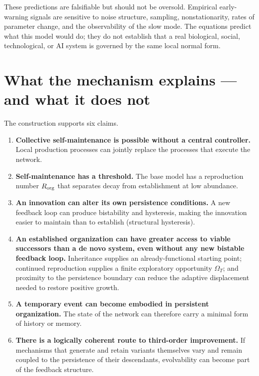 \documentclass[11pt]{article}
\providecommand{\tightlist}{\setlength{\itemsep}{0pt}\setlength{\parskip}{0pt}}
\begin{document}
These predictions are falsifiable but should not be oversold. Empirical
early-warning signals are sensitive to noise structure, sampling,
nonstationarity, rates of parameter change, and the observability of the
slow mode. The equations predict what this model would do; they do not
establish that a real biological, social, technological, or AI system is
governed by the same local normal form.

\section{What the mechanism explains --- and what it does
not}
The construction supports six claims.

\begin{enumerate}
\def\labelenumi{\arabic{enumi}.}
\tightlist
\item
  \textbf{Collective self-maintenance is possible without a central
  controller.} Local production processes can jointly replace the
  processes that execute the network.
\item
  \textbf{Self-maintenance has a threshold.} The base model has a
  reproduction number \(R_{\rm org}\) that separates decay from
  establishment at low abundance.
\item
  \textbf{An innovation can alter its own persistence conditions.} A new
  feedback loop can produce bistability and hysteresis, making the
  innovation easier to maintain than to establish (structural
  hysteresis).
\item
  \textbf{An established organization can have greater access to viable
  successors than a de novo system, even without any new bistable
  feedback loop.} Inheritance supplies an already-functional starting
  point; continued reproduction supplies a finite exploratory
  opportunity \(\Omega_T\); and proximity to the persistence boundary
  can reduce the adaptive displacement needed to restore positive
  growth.
\item
  \textbf{A temporary event can become embodied in persistent
  organization.} The state of the network can therefore carry a minimal
  form of history or memory.
\item
  \textbf{There is a logically coherent route to third-order
  improvement.} If mechanisms that generate and retain variants
  themselves vary and remain coupled to the persistence of their
  descendants, evolvability can become part of the feedback structure.
\end{enumerate}
\end{document}
